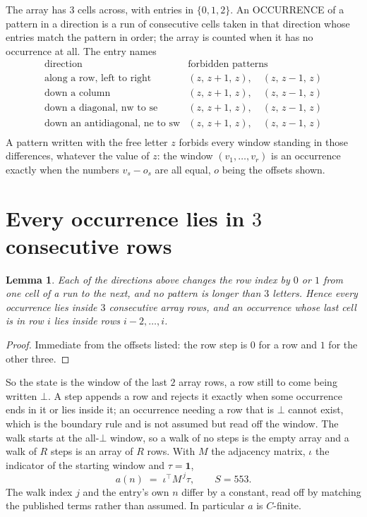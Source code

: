 \documentclass[11pt,a4paper]{article}
\theoremstyle{plain}
\newtheorem{lemma}[theorem]{Lemma}
\theoremstyle{definition}
\begin{document}
The array has $3$ cells across, with entries in $\{0,1,2\}$. An OCCURRENCE of a pattern in a
direction is a run of consecutive cells taken in that direction whose entries match the pattern
in order; the array is counted when it has no occurrence at all. The entry names
\[
\begin{array}{ll}
\text{direction} & \text{forbidden patterns} \\[2pt]
\text{along a row, left to right} & (z,\,z+1,\,z),\quad (z,\,z-1,\,z) \\
\text{down a column} & (z,\,z+1,\,z),\quad (z,\,z-1,\,z) \\
\text{down a diagonal, nw to se} & (z,\,z+1,\,z),\quad (z,\,z-1,\,z) \\
\text{down an antidiagonal, ne to sw} & (z,\,z+1,\,z),\quad (z,\,z-1,\,z) \\
\end{array}
\]
 A pattern written with the free letter $z$ forbids every window standing in those differences, whatever the value of $z$: the window $(v_1,\dots,v_r)$ is an occurrence exactly when the numbers $v_s-o_s$ are all equal, $o$ being the offsets shown.

\section{Every occurrence lies in $3$ consecutive rows}

\begin{lemma}\label{lem:win}
Each of the directions above changes the row index by $0$ or $1$ from one cell of a run to the
next, and no pattern is longer than $3$ letters. Hence every occurrence lies inside $3$
consecutive array rows, and an occurrence whose last cell is in row $i$ lies inside rows
$i-2,\dots,i$.
\end{lemma}

\begin{proof}
Immediate from the offsets listed: the row step is $0$ for a row and $1$ for the other three.
\end{proof}

So the state is the window of the last $2$ array rows, a row still to come being written
$\bot$. A step appends a row and rejects it exactly when some occurrence ends in it or lies
inside it; an occurrence needing a row that is $\bot$ cannot exist, which is the boundary rule
and is not assumed but read off the window. The walk starts at the all-$\bot$ window, so a walk
of no steps is the empty array and a walk of $R$ steps is an array of $R$ rows. With $M$ the
adjacency matrix, $\iota$ the indicator of the starting window and $\tau=\mathbf{1}$,
\[
a(n)\;=\;\iota^{\!\top}M^{\,j}\tau ,\qquad S=553.
\]
The walk index $j$ and the entry's own $n$ differ by a constant, read off by matching the
published terms rather than assumed. In particular $a$ is $C$-finite.
\end{document}
